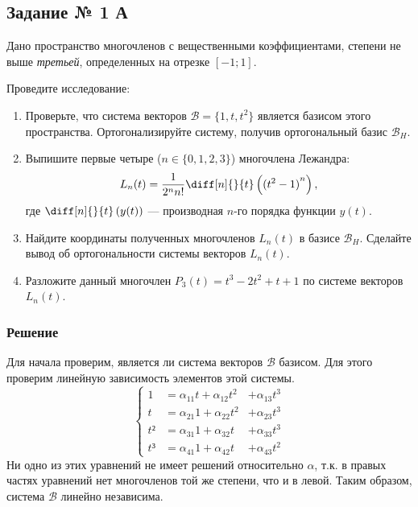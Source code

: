 \subsection{Задание № 1 А}

\newcommand{\Bs}{\mathcal{B}}
\newcommand{\BsH}{{\Bs_H}}
\newcommand{\Leg}[1][n]{{L_{#1}(t)}}

Дано пространство многочленов с вещественными коэффициентами,
степени не выше \textit{третьей}, определенных на отрезке \([-1; 1]\).

Проведите исследование:
\begin{enumerate}
  \item Проверьте, что система векторов \(\Bs = \{1, t, t^2\}\) является
    базисом этого пространства.
    Ортогонализируйте систему, получив ортогональный базис \(\BsH\).
  \item Выпишите первые четыре (\(n \in \{0, 1, 2, 3\}\)) многочлена Лежандра:
    \[
      L_{n}(t)
      = \frac{1}{2^{n} n!} \diff[n]{}{t}\left( {(t^2 - 1)}^{n} \right),
    \]
    где \(\diff[n]{}{t}\left( y(t) \right)\) --- производная \(n\)-го порядка
    функции \(y(t)\).
  \item Найдите координаты полученных многочленов \(L_{n}(t)\) в базисе
    \(\BsH\).
    Сделайте вывод об ортогональности системы векторов \(L_{n}(t)\).
  \item Разложите данный многочлен \(P_{3}(t) = t^3 - 2 t^2 + t + 1\)
    по системе векторов \(L_{n}(t)\).
\end{enumerate}

\subsubsection{Решение}

Для начала проверим, является ли система векторов \(\Bs\) базисом.
Для этого проверим линейную зависимость элементов этой системы.
\[
  \left\{
  \begin{aligned}
    1  &= α_{11} t + α_{12} t^2 &+ α_{13} t^3 \\
    t  &= α_{21} 1 + α_{22} t^2 &+ α_{23} t^3 \\
    t² &= α_{31} 1 + α_{32} t  &+ α_{33} t^3 \\
    t³ &= α_{41} 1 + α_{42} t  &+ α_{43} t^2
  \end{aligned}
  \right.
\]
Ни одно из этих уравнений не имеет решений относительно \(α\), т.к.
в правых частях уравнений нет многочленов той же степени, что и в левой.
Таким образом, система \(\Bs\) линейно независима.

